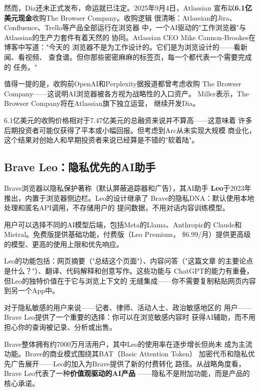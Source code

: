 然而，Dia还未正式发布，命运就已注定。2025年9月4日，Atlassian
宣布以\textbf{6.1亿美元现金}收购The Browser Company。收购逻辑
很清晰：Atlassian的Jira、Confluence、Trello等产品全部运行在浏览器
中，一个AI驱动的"工作浏览器"与Atlassian的生产力套件有着天然的
协同。Atlassian CEO Mike Cannon-Brookes在博客中写道："今天的
浏览器不是为工作设计的。它们是为浏览设计的——看新闻、看视频、
查食谱。但你那些密密麻麻的标签页，每一个都代表一个需要完成的
任务。"

值得一提的是，收购前OpenAI和Perplexity据报道都曾考虑收购
The Browser Company——这说明AI浏览器被各方视为战略性的入口资产。
Miller表示，The Browser Company将在Atlassian旗下独立运营，
继续开发Dia。

6.1亿美元的收购价格相对于7.47亿美元的总融资来说并不算高——这意味着
许多后期投资者可能仅获得了平本或小幅回报。但考虑到Arc从未实现大规模
商业化，这个结果对创始人和早期投资者来说已经算是不错的"软着陆"。

\subsection{Brave Leo：隐私优先的AI助手}
\label{subsec:brave-leo}

Brave浏览器以隐私保护著称（默认屏蔽追踪器和广告），其AI助手
\textbf{Leo}于2023年推出，内置于浏览器侧边栏。Leo的设计继承了
Brave的隐私DNA：默认使用本地处理和匿名API调用，不存储用户的
提问数据，不用对话内容训练模型。

用户可以选择不同的AI模型后端，包括Meta的Llama、Anthropic的
Claude和Mistral。免费版提供基础功能，付费版（Leo Premium，
\$6.99/月）提供更高级的模型、更高的使用上限和优先响应。

Leo的功能包括：网页摘要（"总结这个页面"）、内容问答（"这篇文章
的主要论点是什么？"）、翻译、代码解释和创意写作。这些功能与
ChatGPT的能力有重叠，但Leo的独特价值在于它与浏览上下文的
无缝集成——你不需要复制粘贴网页内容到另一个App中。

对于隐私敏感的用户来说——记者、律师、活动人士、政治敏感地区的
用户——Brave Leo提供了一个重要的选择：你可以在浏览敏感内容时
获得AI辅助，而不用担心你的查询被记录、分析或出售。

Brave整体拥有约7000万月活用户，其中Leo的使用率在逐步增长但尚未
成为主流功能。Brave的商业模式围绕其BAT（Basic Attention Token）
加密代币和隐私优先广告展开——Leo的加入为Brave提供了新的付费转化
路径。从战略角度看，Brave Leo代表了一种\textbf{价值观驱动的AI产品}
——隐私不是附加功能，而是产品的核心承诺。

